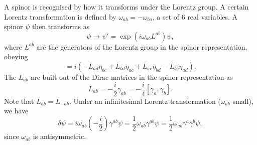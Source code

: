 \documentclass{jknotes} %
\begin{document}
A spinor is recognised by how it transforms under the Lorentz group. A certain Lorentz transformation is defined by \(\omega_{ab}=-\omega_{ba}\), a set of 6 real variables. A spinor \(\psi\) then transforms as
\begin{equation}
    \psi \to \psi' = \exp(i\omega_{ab}L^{ab})\psi,
\end{equation}
where \(L^{ab}\) are the generators of the Lorentz group in the spinor representation, obeying
\begin{equation}
    [L_{ab},L_{cd}] = i(-L_{ad}\eta_{bc}+L_{bd}\eta_{ac}+L_{ac}\eta_{bd}-L_{bc}\eta_{ad}).
\end{equation}
The \(L_{ab}\) are built out of the Dirac matrices in the spinor representation as
\begin{equation}
    L_{ab} = -\frac{i}{2}\gamma_{ab}=-\frac{i}{4}[\gamma_a,\gamma_b].
\end{equation}
Note that \(L_{ab}=L_{-ab}\). Under an infinitesimal Lorentz transformation (\(\omega_{ab}\) small), we have
\begin{equation}
    \delta\psi =  i\omega_{ab}\left(-\frac{i}{2}\right)\gamma^{ab}\psi = \frac{1}{2}\omega_{ab}\gamma^{ab}\psi = \frac{1}{2}\omega_{ab}\gamma^a\gamma^b\psi,
\end{equation}
since \(\omega_{ab}\) is antisymmetric.
\end{document}
